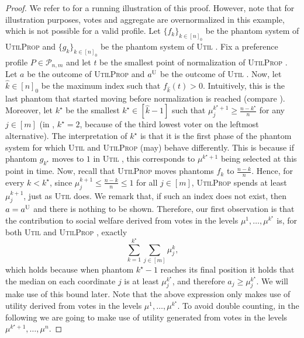 \documentclass[11pt]{article}
\newcommand{\Ut}{\textsc{Util} }
\newcommand{\UtP}{\textsc{UtilProp} }
\newcommand{\Uts}{\textsc{U} } %
\begin{document}
\begin{proof}
    We refer to  for a running illustration of this proof. However, note that for illustration purposes, votes and aggregate are overnormalized in this example, which is not possible for a valid profile. Let $\{f_k\}_{k\in [n]_0}$ be the phantom system of \UtP and $\{g_k\}_{k\in [n]_0}$ be the phantom system of \Ut. Fix a preference profile $P \in \mathcal{P}_{n,m}$ and let $t$ be the smallest point of normalization of \UtP. Let $a$ be the outcome of \UtP and $a^\Uts$ be the outcome of \Ut. Now, let $\hat{k} \in [n]_0$ be the maximum index such that $f_{\hat{k}}(t)>0$. 
    Intuitively, this is the last phantom that started moving before normalization is reached (compare ). Moreover, let $k^\star$ be the smallest $k^\star \in [\hat{k}-1]$ such that $\mu^{k^\star + 1}_j \geq \frac{n-k^\star}{n}$ for any $j \in [m]$ (in , $k^\star = 2$, because of the third lowest voter on the leftmost alternative). 
    The interpretation of $k^\star$ is that it is the first phase of the phantom system for which \Ut and \UtP (may) behave differently. This is because if phantom $g_{k^\star}$ moves to $1$ in \Ut, this corresponds to $\mu^{k^\star + 1}$ being selected at this point in time. Now, recall that \UtP moves phantoms $f_{k}$ to $\frac{n-k}{n}$. 
    Hence, for every $k<k^\star$, since $\mu^{k+1}_j \leq \frac{n-k}{n} \leq 1$ for all $j \in [m]$, \UtP spends at least $\mu^{k + 1}_j$, just as \Ut does.
    We remark that, if such an index does not exist, then $a = a^\Uts$ and there is nothing to be shown.
    Therefore, our first observation is that the contribution to social welfare derived from votes in the levels $\mu^1,\dots,\mu^{k^\star}$ is, for both \Ut and \UtP, exactly
    \begin{equation}\label{eq:mboundone}
        \sum_{k = 1}^{k^\star}\sum_{j \in [m]} \mu_j^k,
    \end{equation}
    which holds because when phantom $k^\star -1$ reaches its final position it holds that the median on each coordinate $j$ is at least $\mu^{k^\star}_j$, and therefore $a_j \ge \mu^{k^\star}_j$. 
    We will make use of this bound later. Note that the above expression only makes use of utility derived from votes in the levels $\mu^1,\dots,\mu^{k^\star}$. To avoid double counting, in the following we are going to make use of utility generated from votes in the levels $\mu^{k^\star + 1}, \dots, \mu^{n}$. %

    \smallskip 


\end{proof}
\end{document}
